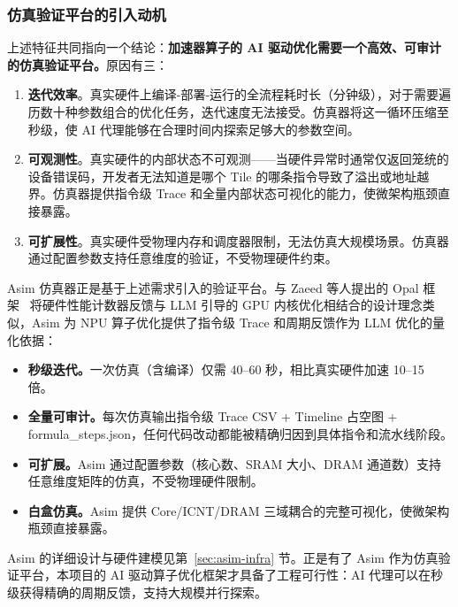 \documentclass{CjC}
\begin{document}
    \subsubsection{仿真验证平台的引入动机}

    上述特征共同指向一个结论：\textbf{加速器算子的 AI
    驱动优化需要一个高效、可审计的仿真验证平台。}原因有三：

    \begin{enumerate}
        \item \textbf{迭代效率}。真实硬件上编译-部署-运行的全流程耗时长（分钟级），对于需要遍历数十种参数组合的优化任务，迭代速度无法接受。仿真器将这一循环压缩至秒级，使
            AI 代理能够在合理时间内探索足够大的参数空间。

        \item \textbf{可观测性}。真实硬件的内部状态不可观测——当硬件异常时通常仅返回笼统的设备错误码，开发者无法知道是哪个
            Tile 的哪条指令导致了溢出或地址越界。仿真器提供指令级 Trace 和全量内部状态可视化的能力，使微架构瓶颈直接暴露。

        \item \textbf{可扩展性}。真实硬件受物理内存和调度器限制，无法仿真大规模场景。仿真器通过配置参数支持任意维度的验证，不受物理硬件约束。
    \end{enumerate}

    Asim 仿真器正是基于上述需求引入的验证平台。与 Zaeed 等人提出的 Opal 框架~\cite{zaeed2025opal}
    将硬件性能计数器反馈与 LLM 引导的 GPU 内核优化相结合的设计理念类似，Asim 为
    NPU 算子优化提供了指令级 Trace 和周期反馈作为 LLM 优化的量化依据：
    \begin{itemize}
        \item \textbf{秒级迭代。}一次仿真（含编译）仅需 40--60
            秒，相比真实硬件加速 10--15 倍。

        \item \textbf{全量可审计。}每次仿真输出指令级 Trace CSV + Timeline 占空图
            + formula\_steps.json，任何代码改动都能被精确归因到具体指令和流水线阶段。

        \item \textbf{可扩展。}Asim 通过配置参数（核心数、SRAM 大小、DRAM 通道数）支持任意维度矩阵的仿真，不受物理硬件限制。

        \item \textbf{白盒仿真。}Asim 提供 Core/ICNT/DRAM 三域耦合的完整可视化，使微架构瓶颈直接暴露。
    \end{itemize}

    Asim 的详细设计与硬件建模见第~\ref{sec:asim-infra} 节。正是有了 Asim 作为仿真验证平台，本项目的
    AI 驱动算子优化框架才具备了工程可行性：AI 代理可以在秒级获得精确的周期反馈，支持大规模并行探索。
\end{document}
